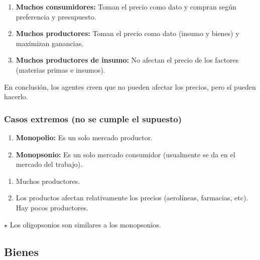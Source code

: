 \documentclass{report}
\newenvironment{obs}{$\star$ }{}
\begin{document}
\begin{enumerate}
\item \textbf{Muchos consumidores:} Toman el precio como dato y compran según preferencia y presupuesto.
\item \textbf{Muchos productores:} Toman el precio como dato (insumo y bienes) y maximizan ganancias.
\item \textbf{Muchos productores de insumo:} No afectan el precio de los factores (materias primas e insumos).
\end{enumerate}

En conclusión, los agentes creen que no pueden afectar los precios, pero sí pueden hacerlo.

\subsubsection{Casos extremos (no se cumple el supuesto)}

\begin{enumerate}
\item \textbf{Monopolio:} Es un solo mercado productor.
\item \textbf{Monopsonio:} Es un solo mercado consumidor (usualmente se da en el mercado del trabajo).
\end{enumerate}

\begin{center}
\end{center}

\begin{enumerate}
\item Muchos productores.
\item Los productos afectan relativamente los precios (aerolíneas, farmacias, etc). Hay pocos productores.
\end{enumerate}

\begin{obs}
Los oligopsonios son similares a los monopsonios.
\end{obs}

\subsection{Bienes}
\end{document}
